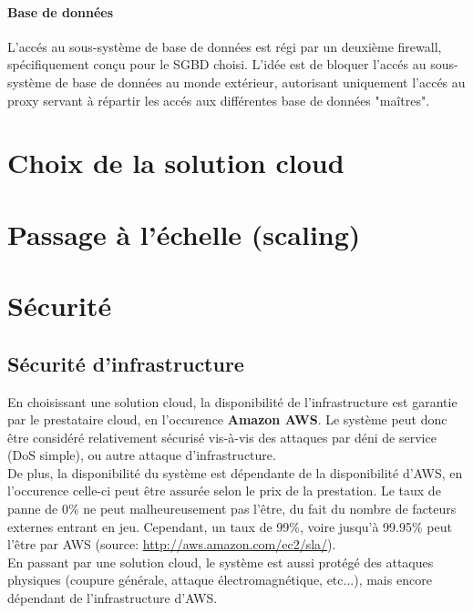 \paragraph{Base de données}

L'accés au sous-système de base de données est régi par un deuxième firewall,
spécifiquement conçu pour le SGBD choisi. L'idée est de bloquer l'accés au
sous-système de base de données au monde extérieur, autorisant uniquement
l'accés au proxy servant à répartir les accés aux différentes base de données
"maîtres". \\

\section{Choix de la solution cloud}
\label{sec:choix-solution-cloud}
\section{Passage à l'échelle (scaling)}
\label{sec:scaling}

\section{Sécurité}
\label{sec:securite}

\subsection{Sécurité d'infrastructure}
\label{subsec:securite-infrastructure}

En choisissant une solution cloud, la disponibilité de l'infrastructure est
garantie par le prestataire cloud, en l'occurence \textbf{Amazon AWS}. Le
système peut donc être considéré relativement sécurisé vis-à-vis des attaques
par déni de service (DoS simple), ou autre attaque d'infrastructure. \\

De plus, la disponibilité du système est dépendante de la disponibilité d'AWS,
en l'occurence celle-ci peut être assurée selon le prix de la prestation. Le
taux de panne de 0\% ne peut malheureusement pas l'être, du fait du nombre de
facteurs externes entrant en jeu. Cependant, un taux de 99\%, voire jusqu'à
99.95\% peut l'être par AWS (source: \url{http://aws.amazon.com/ec2/sla/}). \\

En passant par une solution cloud, le système est aussi protégé des attaques
physiques (coupure générale, attaque électromagnétique, etc...), mais encore
dépendant de l'infrastructure d'AWS.

